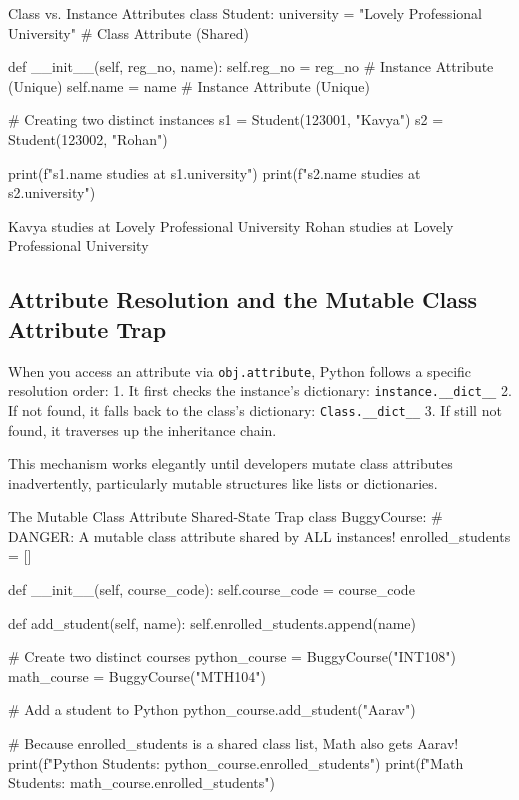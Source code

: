 \begin{pythoncode}{Class vs. Instance Attributes}
class Student:
    university = "Lovely Professional University" # Class Attribute (Shared)
    
    def __init__(self, reg_no, name):
        self.reg_no = reg_no  # Instance Attribute (Unique)
        self.name = name      # Instance Attribute (Unique)

# Creating two distinct instances
s1 = Student(123001, "Kavya")
s2 = Student(123002, "Rohan")

print(f"{s1.name} studies at {s1.university}")
print(f"{s2.name} studies at {s2.university}")
\end{pythoncode}

\begin{outputbox}
Kavya studies at Lovely Professional University
Rohan studies at Lovely Professional University
\end{outputbox}

\subsection{Attribute Resolution and the Mutable Class Attribute Trap}

When you access an attribute via \texttt{obj.attribute}, Python follows a specific resolution order:
1. It first checks the instance's dictionary: \texttt{instance.\_\_dict\_\_}
2. If not found, it falls back to the class's dictionary: \texttt{Class.\_\_dict\_\_}
3. If still not found, it traverses up the inheritance chain.

This mechanism works elegantly until developers mutate class attributes inadvertently, particularly mutable structures like lists or dictionaries.

\begin{pythoncode}{The Mutable Class Attribute Shared-State Trap}
class BuggyCourse:
    # DANGER: A mutable class attribute shared by ALL instances!
    enrolled_students = []
    
    def __init__(self, course_code):
        self.course_code = course_code
        
    def add_student(self, name):
        self.enrolled_students.append(name)

# Create two distinct courses
python_course = BuggyCourse("INT108")
math_course = BuggyCourse("MTH104")

# Add a student to Python
python_course.add_student("Aarav")

# Because enrolled_students is a shared class list, Math also gets Aarav!
print(f"Python Students: {python_course.enrolled_students}")
print(f"Math Students: {math_course.enrolled_students}")
\end{pythoncode}

